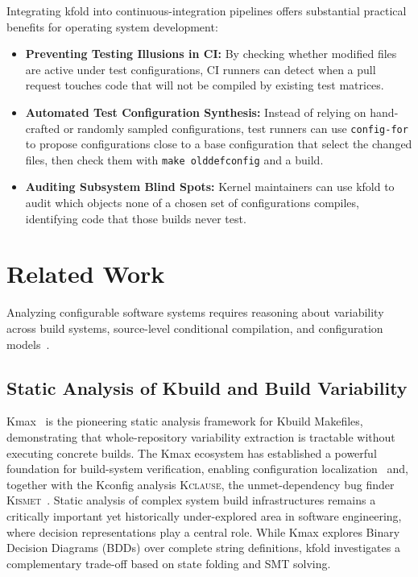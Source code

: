 \documentclass[acmsmall]{acmart}
\newcommand{\tool}{\textsf{kfold}\xspace}
\newcommand{\kmax}{\textsf{Kmax}\xspace}
\newcounter{none}
\providecommand{\tightlist}{\setlength{\itemsep}{0pt}\setlength{\parskip}{0pt}}
\begin{document}
Integrating \tool into continuous-integration pipelines offers substantial practical benefits for operating system development:
\begin{itemize}
\tightlist
\item \textbf{Preventing Testing Illusions in CI:} By checking whether modified files are active under test configurations, CI runners can detect when a pull request touches code that will not be compiled by existing test matrices.
\item \textbf{Automated Test Configuration Synthesis:} Instead of relying on hand-crafted or randomly sampled configurations, test runners can use \texttt{config-for} to propose configurations close to a base configuration that select the changed files, then check them with \texttt{make olddefconfig} and a build.
\item \textbf{Auditing Subsystem Blind Spots:} Kernel maintainers can use \tool to audit which objects none of a chosen set of configurations compiles, identifying code that those builds never test.
\end{itemize}

\section{Related Work}\label{sec:related-work}

Analyzing configurable software systems requires reasoning about variability across build systems, source-level conditional compilation, and configuration models~\cite{apel2013feature,thum2014potential,berger2013variability}.

\subsection{Static Analysis of Kbuild and Build Variability}

\kmax~\cite{gazzillo2017kmax} is the pioneering static analysis framework for Kbuild Makefiles, demonstrating that whole-repository variability extraction is tractable without executing concrete builds.
The \kmax ecosystem has established a powerful foundation for build-system verification, enabling configuration localization~\cite{gazzillo2018localizing} and, together with the Kconfig analysis \textsc{Kclause}, the unmet-dependency bug finder \textsc{Kismet}~\cite{oh2021kclause}.
Static analysis of complex system build infrastructures remains a critically important yet historically under-explored area in software engineering, where decision representations play a central role.
While \kmax explores Binary Decision Diagrams (BDDs) over complete string definitions, \tool investigates a complementary trade-off based on state folding and SMT solving.
\end{document}
